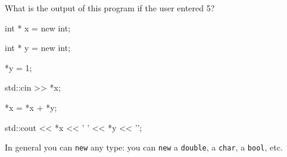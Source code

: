 What is the output of this program if the user entered 5?



\begin{consolethree}[escapeinside=||]

int * x = new int;

int * y = new int;

*y = 1;



std::cin >> *x;

*x = *x + *y;



std::cout << *x << ' ' << *y << '\n';

\end{consolethree}

In general you can \texttt{new} any type: you can \texttt{new} a \texttt{double}, a \texttt{char}, a \texttt{bool}, etc.

